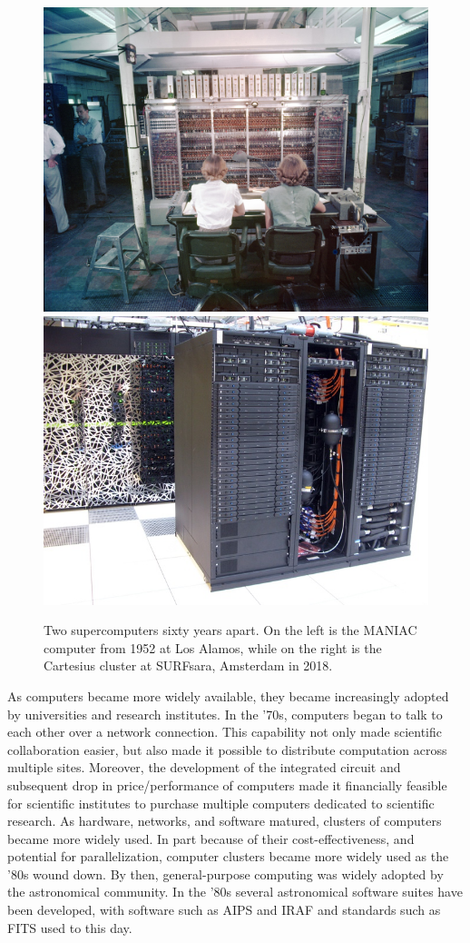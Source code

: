 \begin{figure}[h]
\includegraphics[width=.45\linewidth]{background/figures/Maniac_1952.jpg}\quad\includegraphics[width=.45\linewidth]{background/figures/cartesius.jpeg}
    \caption[Two supercomputers sixty years apart.]{Two supercomputers sixty years apart. On the left is the MANIAC computer from 1952 at Los Alamos, while on the right is the Cartesius cluster at SURFsara, Amsterdam in 2018.}
    \label{fig:intro_supercomputers}

\end{figure}

As computers became more widely available, they became increasingly adopted by universities and research institutes. In the '70s, computers began to talk to each other over a network connection. This capability not only made scientific collaboration easier, but also made it possible to distribute computation across multiple sites. Moreover, the development of the integrated circuit and subsequent drop in price/performance of computers made it financially feasible for scientific institutes to purchase multiple computers dedicated to scientific research. As hardware, networks, and software matured, clusters of computers became more widely used\citep{tel_2000}. In part because of their cost-effectiveness, and potential for parallelization, computer clusters became more widely used as the '80s wound down. By then, general-purpose computing was widely adopted by the astronomical community. In the '80s several astronomical software suites have been developed, with software such as AIPS\citep{AIPS_NRAO} and IRAF\citep{iraf} and standards such as FITS\citep{1979fits} used to this day. 

